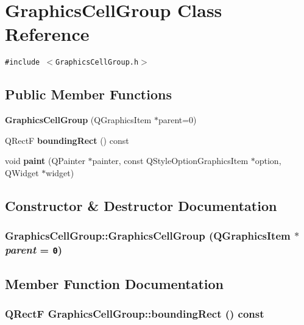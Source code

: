 \section{GraphicsCellGroup Class Reference}
\label{classGraphicsCellGroup}
{\tt \#include $<$GraphicsCellGroup.h$>$}

\subsection*{Public Member Functions}
\begin{CompactItemize}
\item 
{\bf GraphicsCellGroup} (QGraphicsItem $\ast$parent=0)
\item 
QRectF {\bf boundingRect} () const 
\item 
void {\bf paint} (QPainter $\ast$painter, const QStyleOptionGraphicsItem $\ast$option, QWidget $\ast$widget)
\end{CompactItemize}


\subsection{Constructor \& Destructor Documentation}
\subsubsection{\setlength{\rightskip}{0pt plus 5cm}GraphicsCellGroup::GraphicsCellGroup (QGraphicsItem $\ast$ {\em parent} = {\tt 0})}\label{classGraphicsCellGroup_f990dffee2103e56a69f35c0fa1c48e8}




\subsection{Member Function Documentation}
\subsubsection{\setlength{\rightskip}{0pt plus 5cm}QRectF GraphicsCellGroup::boundingRect () const}\label{classGraphicsCellGroup_dbcaef43b6b2db8c318b2c87fc00d950}


